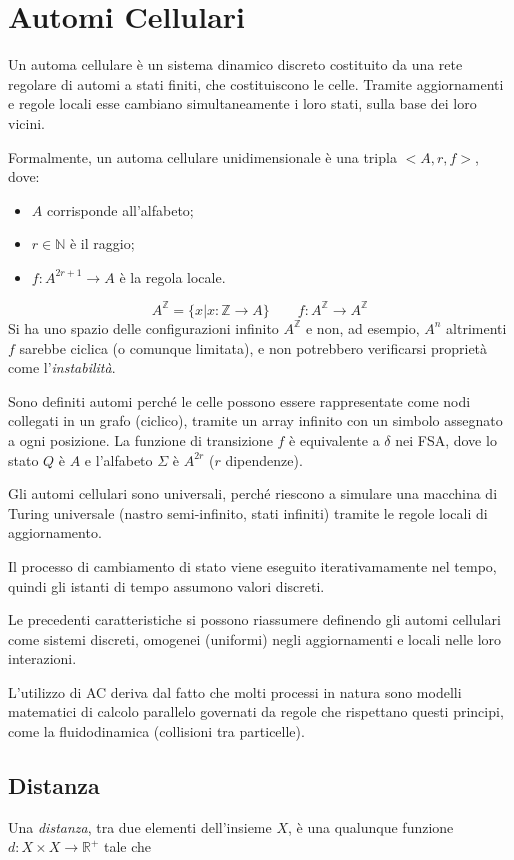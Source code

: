 \section{Automi Cellulari}
Un automa cellulare è un sistema dinamico discreto costituito da una rete regolare di automi a stati finiti, che costituiscono le celle. Tramite aggiornamenti e regole locali esse cambiano simultaneamente i loro stati, sulla base dei loro vicini.

Formalmente, un automa cellulare unidimensionale è una tripla $< A, r, f >$, dove:
\begin{itemize}
	\item $A$ corrisponde all'alfabeto;
	\item $r \in \mathds{N}$ è il raggio;
	\item $f : A^{2r+1} \rightarrow A$ è la regola locale.
\end{itemize}

$$A^\mathds{Z} = \{ x | x: \mathds{Z} \rightarrow A\} \qquad f : A^\mathds{Z} \rightarrow A^\mathds{Z} $$
Si ha uno spazio delle configurazioni infinito $A^\mathds{Z}$ e non, ad esempio, $A^n$ altrimenti $f$ sarebbe ciclica (o comunque limitata), e non potrebbero verificarsi proprietà come l'\textit{instabilità}.

Sono definiti automi perché le celle possono essere rappresentate come nodi collegati in un grafo (ciclico), tramite un array infinito con un simbolo assegnato a ogni posizione. La funzione di transizione $f$ è equivalente a $\delta$ nei FSA, dove lo stato $Q$ è $A$ e l'alfabeto $\Sigma$ è $A^{2r}$ ($r$ dipendenze).

Gli automi cellulari sono universali, perché riescono a simulare una macchina di Turing universale (nastro semi-infinito, stati infiniti) tramite le regole locali di aggiornamento.

Il processo di cambiamento di stato viene eseguito iterativamamente nel tempo, quindi gli istanti di tempo assumono valori discreti.

Le precedenti caratteristiche si possono riassumere definendo gli automi cellulari come sistemi discreti, omogenei (uniformi) negli aggiornamenti e locali nelle loro interazioni.

L'utilizzo di AC deriva dal fatto che molti processi in natura sono modelli matematici di calcolo parallelo governati da regole che rispettano questi principi, come la fluidodinamica (collisioni tra particelle). 

\subsection{Distanza}
Una \textit{distanza}, tra due elementi dell'insieme $X$, è una qualunque funzione $d: X \times X \rightarrow \mathds{R}^{+}$ tale che
	
